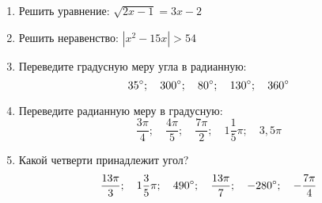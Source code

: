 \documentclass[12pt, a4paper]{article}
\begin{document}
	
	
	\begin{enumerate}
		\item Решить уравнение:
		$\sqrt{2x-1}=3x-2$
		\item Решить неравенство:
		$|x^2-15x|>54$
		\item Переведите градусную меру угла в радианную:
		$$35\degree;\quad 300\degree;\quad 80\degree;\quad 130\degree;\quad 360\degree$$
		
		\item Переведите радианную меру в градусную:
		$$\dfrac{3\pi}{4};\quad \dfrac{4\pi}{5};\quad \dfrac{7\pi}{2};\quad 1\dfrac{1}{5}\pi;\quad 3,5\pi$$
		
		\item Какой четверти принадлежит угол?
		$$\dfrac{13\pi}{3};\quad 1\dfrac{3}{5}\pi;\quad 490\degree;\quad \dfrac{13\pi}{7};\quad -280\degree;\quad -\dfrac{7\pi}{4}$$
		

\end{enumerate}
\end{document}
